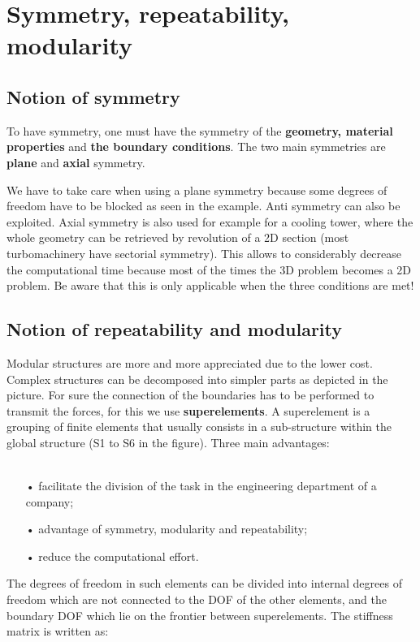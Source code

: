 
\chapter{Symmetry, repeatability, modularity}
\section{Notion of symmetry}
	To have symmetry, one must have the symmetry of the \textbf{geometry, material properties} and \textbf{the boundary conditions}. The two main symmetries are \textbf{plane} and \textbf{axial} symmetry. 
	
	We have to take care when using a plane symmetry because some degrees of freedom have to be blocked as seen in the example. Anti symmetry can also be exploited. Axial symmetry is also used for example for a cooling tower, where the whole geometry can be retrieved by revolution of a 2D section (most turbomachinery have sectorial symmetry). This allows to considerably decrease the computational time because most of the times the 3D problem becomes a 2D problem. Be aware that this is only applicable when the three conditions are met! 
	
\section{Notion of repeatability and modularity}
	Modular structures are more and more appreciated due to the lower cost. Complex structures can be decomposed into simpler parts as depicted in the picture. For sure the connection of the boundaries has to be performed to transmit the forces, for this we use \textbf{superelements}. A superelement is a grouping of finite elements that usually consists in a sub-structure within the global structure (S1 to S6 in the figure). Three main advantages: \\\\
	
	\begin{itemize}
	\item[•]	facilitate the division of the task in the engineering department of a company; 
	\item[•] advantage of symmetry, modularity and repeatability; 
	\item[•] reduce the computational effort. \\
	\end{itemize}
	
	The degrees of freedom in such elements can be divided into internal degrees of freedom which are not connected to the DOF of the other elements, and the boundary DOF which lie on the frontier between superelements. The stiffness matrix is written as: 
	
